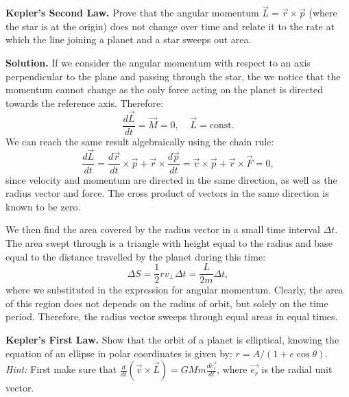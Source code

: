 \documentclass[11pt]{article}
\begin{document}
\textbf{Kepler's Second Law.} Prove that the angular momentum $\vec{L}=\vec{r}\times\vec{p}$ (where the star is at the origin) does not change over time and relate it to the rate at which the line joining a planet and a star sweeps out area.

\textbf{Solution.} If we consider the angular momentum with respect to an axis perpendicular to the plane and passing through the star, the we notice that the momentum cannot change as the only force acting on the planet is directed towards the reference axis. Therefore:
$$\dfrac{d\vec{L}}{dt}=\vec{M}=0,\;\;\;\;\vec{L}=\text{const.}$$
We can reach the same result algebraically using the chain rule:
$$\dfrac{d\vec{L}}{dt}=\dfrac{d\vec{r}}{dt}\times\vec{p}+\vec{r}\times\dfrac{d\vec{p}}{dt}=\vec{v}\times\vec{p}+\vec{r}\times\vec{F}=0,$$
since velocity and momentum are directed in the same direction, as well as the radius vector and force. The cross product of vectors in the same direction is known to be zero.

We then find the area covered by the radius vector in a small time interval $\Delta t$. The area swept through is a triangle with height equal to the radius and base equal to the distance travelled by the planet during this time:
$$\Delta S=\dfrac{1}{2}rv_\bot\Delta t=\dfrac{L}{2m}\Delta t,$$
where we substituted in the expression for angular momentum. Clearly, the area of this region does not depends on the radius of orbit, but solely on the time period. Therefore, the radius vector sweeps through equal areas in equal times.

\textbf{Kepler's First Law.} Show that the orbit of a planet is elliptical, knowing the equation of an ellipse in polar coordinates is given by: $r=A/(1+e\cos\theta)$. \textit{Hint:} First make sure that $\displaystyle \frac{d}{dt}(\vec{v}\times\vec{L})=GMm\frac{d\vec{e_r}}{dt}$, where $\vec{e_r}$ is the radial unit vector.
\end{document}

